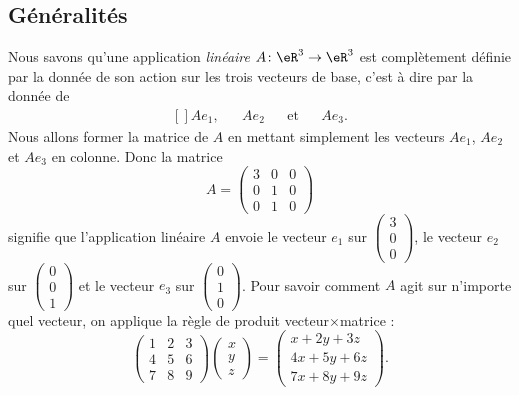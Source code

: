 \subsection{Généralités}

Nous savons qu'une application \emph{linéaire} $A\colon \eR^3\to \eR^3$ est complètement définie par la donnée de son action sur les trois vecteurs de base, c'est à dire par la donnée de
\begin{equation}
	\begin{aligned}[]
		Ae_1,&&Ae_2&&\text{et}&&Ae_3.
	\end{aligned}
\end{equation}
Nous allons former la matrice de $A$ en mettant simplement les vecteurs $Ae_1$, $Ae_2$ et $Ae_3$ en colonne. Donc la matrice
\begin{equation}		\label{EqExempleALin}
	A=\begin{pmatrix}
		3	&	0	&	0	\\
		0	&	1	&	0	\\
		0	&	1	&	0
	\end{pmatrix}
\end{equation}
signifie que l'application linéaire $A$ envoie le vecteur $e_1$ sur $\begin{pmatrix}
	3	\\ 
	0	\\ 
	0	
\end{pmatrix}$, le vecteur $e_2$ sur $\begin{pmatrix}
	0	\\ 
	0	\\ 
	1	
\end{pmatrix}$ et le vecteur $e_3$ sur $\begin{pmatrix}
	0	\\ 
	1	\\ 
	0	
\end{pmatrix}$.
Pour savoir comment $A$ agit sur n'importe quel vecteur, on applique la règle de produit vecteur$\times$matrice :
\begin{equation}
	\begin{pmatrix}
		1	&	2	&	3	\\
		4	&	5	&	6	\\
		7	&	8	&	9
	\end{pmatrix}\begin{pmatrix}
		x	\\ 
		y	\\ 
		z	
	\end{pmatrix}=
	\begin{pmatrix}
		x+2y+3z	\\ 
		4x+5y+6z	\\ 
		7x+8y+9z	
	\end{pmatrix}.
\end{equation}

